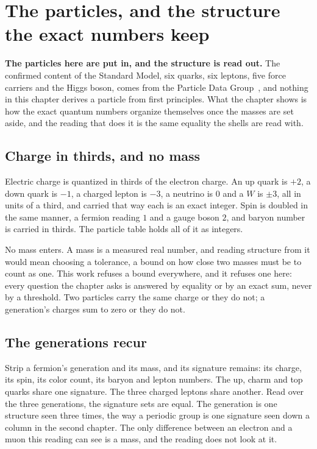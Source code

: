 \chapter{The particles, and the structure the exact numbers keep}

\textbf{The particles here are put in, and the structure is read out.} The confirmed content of the
Standard Model, six quarks, six leptons, five force carriers and the Higgs boson, comes from the
Particle Data Group~\cite{src:Particle-Data-Group}, and nothing in this chapter derives a particle from
first principles. What the chapter shows is how the exact quantum numbers organize themselves once
the masses are set aside, and the reading that does it is the same equality the shells are read with.

\section{Charge in thirds, and no mass}

Electric charge is quantized in thirds of the electron charge. An up quark is $+2$, a down quark is
$-1$, a charged lepton is $-3$, a neutrino is $0$ and a $W$ is $\pm 3$, all in units of a third, and
carried that way each is an exact integer. Spin is doubled in the same manner, a fermion reading $1$
and a gauge boson $2$, and baryon number is carried in thirds. The particle table holds all of it as
integers.

No mass enters. A mass is a measured real number, and reading structure from it would mean choosing a
tolerance, a bound on how close two masses must be to count as one. This work refuses a bound
everywhere, and it refuses one here: every question the chapter asks is answered by equality or by an
exact sum, never by a threshold. Two particles carry the same charge or they do not; a generation's
charges sum to zero or they do not.

\section{The generations recur}

Strip a fermion's generation and its mass, and its signature remains: its charge, its spin, its
color count, its baryon and lepton numbers. The up, charm and top quarks share one signature. The
three charged leptons share another. Read over the three generations, the signature sets are equal.
The generation is one structure seen three times, the way a periodic group is one signature seen down
a column in the second chapter. The only difference between an electron and a muon this reading can
see is a mass, and the reading does not look at it.

